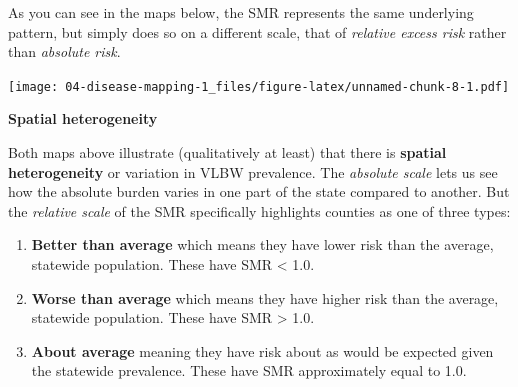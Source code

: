 \documentclass[
]{book}
\newenvironment{Shaded}{\begin{snugshade}}{\end{snugshade}}
\newcommand{\AttributeTok}[1]{\textcolor[rgb]{0.77,0.63,0.00}{#1}}
\newcommand{\CommentTok}[1]{\textcolor[rgb]{0.56,0.35,0.01}{\textit{#1}}}
\newcommand{\FunctionTok}[1]{\textcolor[rgb]{0.00,0.00,0.00}{#1}}
\newcommand{\NormalTok}[1]{#1}
\newcommand{\OtherTok}[1]{\textcolor[rgb]{0.56,0.35,0.01}{#1}}
\newcommand{\SpecialCharTok}[1]{\textcolor[rgb]{0.00,0.00,0.00}{#1}}
\providecommand{\tightlist}{%
  \setlength{\itemsep}{0pt}\setlength{\parskip}{0pt}}
\newenvironment{rmdtip}[1]
  {
  \begin{itemize}
  \renewcommand{\labelitemi}{
    \raisebox{-.7\height}[0pt][0pt]{
      {\setkeys{Gin}{width=3em,keepaspectratio}\texttt{[image: images/\#1]}}
    }
  }
  \setlength{\fboxsep}{1em}
  \begin{tip}
  \item
  }
  {
  \end{tip}
  \end{itemize}
  }
\begin{document}
\begin{Shaded}
\end{Shaded}

As you can see in the maps below, the SMR represents the same underlying pattern, but simply does so on a different scale, that of \emph{relative excess risk} rather than \emph{absolute risk}.

\texttt{[image: 04-disease-mapping-1\_files/figure-latex/unnamed-chunk-8-1.pdf]}

\begin{rmdtip}{tip}

\textbf{Spatial heterogeneity}

Both maps above illustrate (qualitatively at least) that there is \textbf{spatial heterogeneity} or variation in VLBW prevalence. The \emph{absolute scale} lets us see how the absolute burden varies in one part of the state compared to another. But the \emph{relative scale} of the SMR specifically highlights counties as one of three types:

\begin{enumerate}
\def\labelenumi{\arabic{enumi}.}
\tightlist
\item
  \textbf{Better than average} which means they have lower risk than the average, statewide population. These have SMR \textless{} 1.0.
\item
  \textbf{Worse than average} which means they have higher risk than the average, statewide population. These have SMR \textgreater{} 1.0.
\item
  \textbf{About average} meaning they have risk about as would be expected given the statewide prevalence. These have SMR approximately equal to 1.0.
\end{enumerate}

\end{rmdtip}
\end{document}
